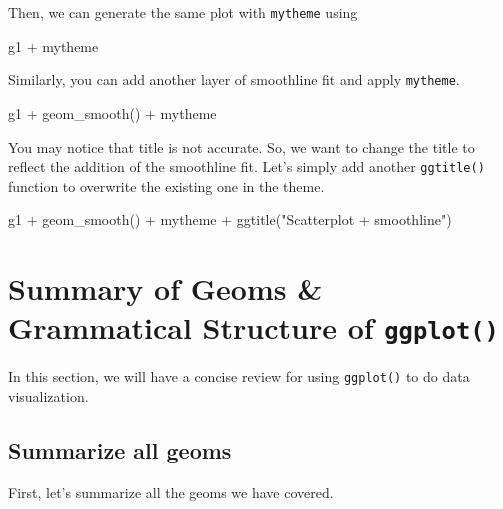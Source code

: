 \documentclass[
]{book}
\newenvironment{Shaded}{\begin{snugshade}}{\end{snugshade}}
\newcommand{\FunctionTok}[1]{\textcolor[rgb]{0.00,0.00,0.00}{#1}}
\newcommand{\NormalTok}[1]{#1}
\newcommand{\SpecialCharTok}[1]{\textcolor[rgb]{0.00,0.00,0.00}{#1}}
\newcommand{\StringTok}[1]{\textcolor[rgb]{0.31,0.60,0.02}{#1}}
\begin{document}
Then, we can generate the same plot with \texttt{mytheme} using

\begin{Shaded}
\begin{Highlighting}[]
\NormalTok{g1 }\SpecialCharTok{+}\NormalTok{ mytheme}
\end{Highlighting}
\end{Shaded}

Similarly, you can add another layer of smoothline fit and apply \texttt{mytheme}.

\begin{Shaded}
\begin{Highlighting}[]
\NormalTok{g1 }\SpecialCharTok{+} \FunctionTok{geom\_smooth}\NormalTok{() }\SpecialCharTok{+}\NormalTok{ mytheme}
\end{Highlighting}
\end{Shaded}

You may notice that title is not accurate. So, we want to change the title to reflect the addition of the smoothline fit. Let's simply add another \texttt{ggtitle()} function to overwrite the existing one in the theme.

\begin{Shaded}
\begin{Highlighting}[]
\NormalTok{g1 }\SpecialCharTok{+} \FunctionTok{geom\_smooth}\NormalTok{() }\SpecialCharTok{+}\NormalTok{ mytheme }\SpecialCharTok{+} 
  \FunctionTok{ggtitle}\NormalTok{(}\StringTok{"Scatterplot + smoothline"}\NormalTok{) }
\end{Highlighting}
\end{Shaded}

\hypertarget{summary-geom}{%
\section{\texorpdfstring{Summary of Geoms \& Grammatical Structure of \texttt{ggplot()}}{Summary of Geoms \& Grammatical Structure of ggplot()}}\label{summary-geom}}

In this section, we will have a concise review for using \texttt{ggplot()} to do data visualization.

\hypertarget{summarize-all-geoms}{%
\subsection{Summarize all geoms}\label{summarize-all-geoms}}

First, let's summarize all the geoms we have covered.
\end{document}
